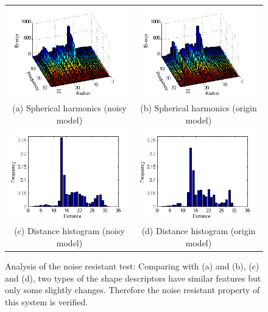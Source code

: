 \begin{figure}
\begin{center}
\begin{tabular}{cc}   %
   \includegraphics[width=0.45\linewidth]{noiseinvariant_test_SH10_denoise} & 
   \includegraphics[width=0.45\linewidth]{noiseinvariant_test_SH10_origin}  \\
   (a) Spherical harmonics (noisy model) & (b) Spherical harmonics (origin model)\\
   \includegraphics[width=0.45\linewidth]{noiseinvariant_test_DH10_denoise} &
   \includegraphics[width=0.45\linewidth]{noiseinvariant_test_DH10_origin}  \\
   (c) Distance histogram (noisy model) & (d) Distance histogram (origin model)\\
\end{tabular}
\caption{Analysis of the noise resistant test: Comparing with (a) and (b), (c) and (d), two types of the shape descriptors have similar features but only some slightly changes. Therefore the noise resistant property of this system is verified. } 
  \label{noiseinvarianttest_analysis}
\end{center}
\end{figure}

